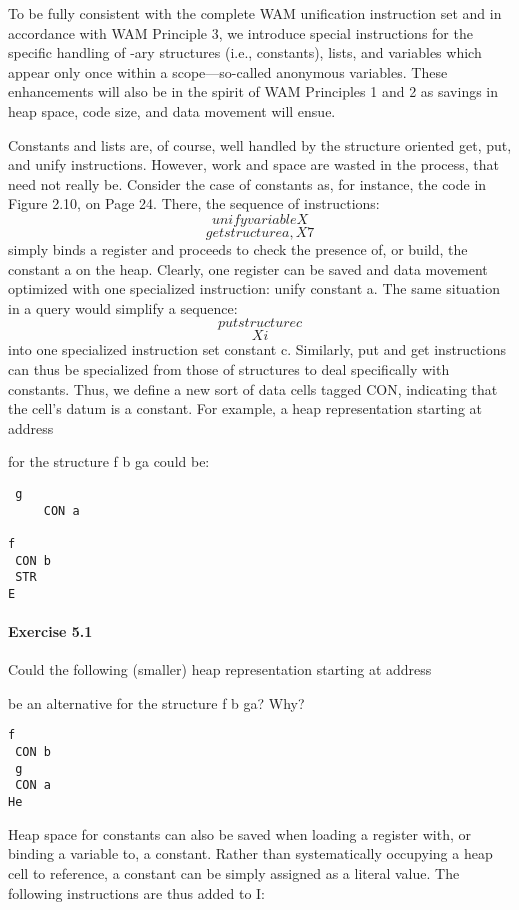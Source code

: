
To be fully consistent with the complete WAM unification instruction set and in
accordance with WAM Principle 3, we introduce special instructions for the specific
handling of -ary structures (i.e., constants), lists, and variables which appear
only once within a scope—so-called anonymous variables. These enhancements
will also be in the spirit of WAM Principles 1 and 2 as savings in heap space, code
size, and data movement will ensue.

Constants and lists are, of course, well handled by the structure oriented get,
put, and unify instructions. However, work and space are wasted in the process,
that need not really be. Consider the case of constants as, for instance, the
code in Figure 2.10, on Page 24. There, the sequence of instructions:
\[unify variable X\]
\[get structure a,X7\]
simply binds a register and proceeds to check the presence of, or build, the constant
a on the heap. Clearly, one register can be saved and data movement optimized
with one specialized instruction: unify constant a. The same 
situation in a query would simplify a sequence:
\[put structure c\]
\[Xi\]
into one specialized instruction set constant c. Similarly, put and get instructions
can thus be specialized from those of structures to deal specifically with
constants. Thus, we define a new sort of data cells tagged CON, indicating that the
cell’s datum is a constant. For example, a heap representation starting at address

 for the structure f b
ga
could be:
\begin{verbatim}
 g
	 CON a

f
 CON b
 STR 
E
\end{verbatim}

\paragraph{Exercise 5.1} Could the following (smaller) heap representation
starting at address

be an alternative for the structure f b ga? Why?

\begin{verbatim}
f
 CON b
 g
 CON a
He
\end{verbatim}

Heap space for constants can also be saved when loading a register with, or binding
a variable to, a constant. Rather than systematically occupying a heap cell
to reference, a constant can be simply assigned as a literal value. The following
instructions are thus added to I:

